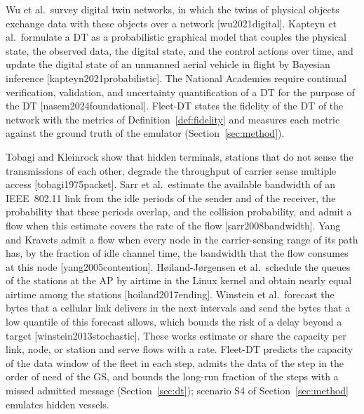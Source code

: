 
Wu et al.\ survey digital twin networks, in which the twins of physical objects exchange data with these objects over a network [wu2021digital]. Kapteyn et al.\ formulate a DT as a probabilistic graphical model that couples the physical state, the observed data, the digital state, and the control actions over time, and update the digital state of an unmanned aerial vehicle in flight by Bayesian inference [kapteyn2021probabilistic]. The National Academies require continual verification, validation, and uncertainty quantification of a DT for the purpose of the DT [nasem2024foundational]. Fleet-DT states the fidelity of the DT of the network with the metrics of Definition~\ref{def:fidelity} and measures each metric against the ground truth of the emulator (Section~\ref{sec:method}).

Tobagi and Kleinrock show that hidden terminals, stations that do not sense the transmissions of each other, degrade the throughput of carrier sense multiple access [tobagi1975packet]. Sarr et al.\ estimate the available bandwidth of an IEEE~802.11 link from the idle periods of the sender and of the receiver, the probability that these periods overlap, and the collision probability, and admit a flow when this estimate covers the rate of the flow [sarr2008bandwidth]. Yang and Kravets admit a flow when every node in the carrier-sensing range of its path has, by the fraction of idle channel time, the bandwidth that the flow consumes at this node [yang2005contention]. H{\o}iland-J{\o}rgensen et al.\ schedule the queues of the stations at the AP by airtime in the Linux kernel and obtain nearly equal airtime among the stations [hoiland2017ending]. Winstein et al.\ forecast the bytes that a cellular link delivers in the next intervals and send the bytes that a low quantile of this forecast allows, which bounds the risk of a delay beyond a target [winstein2013stochastic]. These works estimate or share the capacity per link, node, or station and serve flows with a rate. Fleet-DT predicts the capacity of the data window of the fleet in each step, admits the data of the step in the order of need of the GS, and bounds the long-run fraction of the steps with a missed admitted message (Section~\ref{sec:dt}); scenario S4 of Section~\ref{sec:method} emulates hidden vessels.

